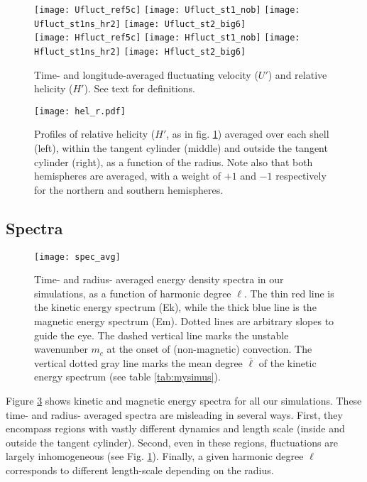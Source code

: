 \documentclass[12pt, a4paper]{article}
\begin{document}
\begin{figure}
\texttt{[image: Ufluct\_ref5c]}
\texttt{[image: Ufluct\_st1\_nob]}
\texttt{[image: Ufluct\_st1ns\_hr2]}
\texttt{[image: Ufluct\_st2\_big6]} \\
\texttt{[image: Hfluct\_ref5c]}
\texttt{[image: Hfluct\_st1\_nob]}
\texttt{[image: Hfluct\_st1ns\_hr2]}
\texttt{[image: Hfluct\_st2\_big6]} \\
\caption{Time- and longitude-averaged fluctuating velocity ($U'$) and relative helicity ($H'$). See text for definitions.}
\label{fig:avg_fluct}
\end{figure}


\begin{figure}
\texttt{[image: hel\_r.pdf]}
\caption{Profiles of relative helicity ($H'$, as in fig. \ref{fig:avg_fluct}) averaged over each shell (left), within the tangent cylinder (middle) and outside the tangent cylinder (right), as a function of the radius.
Note also that both hemispheres are averaged, with a weight of $+1$ and $-1$ respectively for the northern and southern hemispheres.}
\label{fig:helprof}
\end{figure}


\subsection{Spectra} \label{sec:spec}

\begin{figure}
\begin{center}
\texttt{[image: spec\_avg]}
\caption{Time- and radius- averaged energy density spectra in our simulations, as a function of harmonic degree $\ell$.
The thin red line is the kinetic energy spectrum (Ek), while the thick blue line is the magnetic energy spectrum (Em).
Dotted lines are arbitrary slopes to guide the eye.
The dashed vertical line marks the unstable wavenumber $m_c$ at the onset of (non-magnetic) convection.
The vertical dotted gray line marks the mean degree $\bar{\ell}$ of the kinetic energy spectrum (see table \ref{tab:mysimus}).
}
\label{fig:spec_avg}
\end{center}
\end{figure}

Figure \ref{fig:spec_avg} shows kinetic and magnetic energy spectra for all our simulations.
These time- and radius- averaged spectra are misleading in several ways.
First, they encompass regions with vastly different dynamics and length scale (inside and outside the tangent cylinder).
Second, even in these regions, fluctuations are largely inhomogeneous (see Fig. \ref{fig:avg_fluct}).
Finally, a given harmonic degree $\ell$ corresponds to different length-scale depending on the radius.
\end{document}
